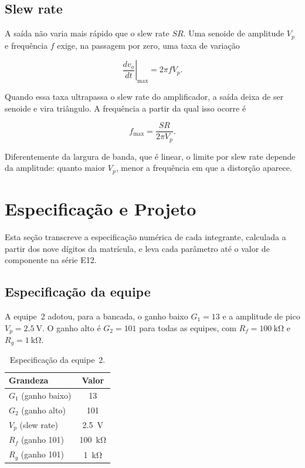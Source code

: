 \documentclass[11pt,a4paper]{article}
\begin{document}
\subsection{Slew rate}

A saída não varia mais rápido que o slew rate $SR$. Uma senoide de amplitude $V_p$ e frequência $f$ exige, na passagem por zero, uma taxa de variação

\begin{equation}
\left. \frac{dv_o}{dt} \right|_{\max} = 2\pi f V_p .
\label{eq:slew}
\end{equation}

Quando essa taxa ultrapassa o slew rate do amplificador, a saída deixa de ser senoide e vira triângulo. A frequência a partir da qual isso ocorre é

\begin{equation}
f_{\max} = \frac{SR}{2\pi V_p} .
\label{eq:fmax}
\end{equation}

Diferentemente da largura de banda, que é linear, o limite por slew rate depende da amplitude: quanto maior $V_p$, menor a frequência em que a distorção aparece.

\section{Especificação e Projeto}

Esta seção transcreve a especificação numérica de cada integrante, calculada a partir dos nove dígitos da matrícula, e leva cada parâmetro até o valor de componente na série E12.

\subsection{Especificação da equipe}

A equipe~2 adotou, para a bancada, o ganho baixo $G_1 = 13$ e a amplitude de pico $V_p = \SI{2,5}{\volt}$. O ganho alto é $G_2 = 101$ para todas as equipes, com $R_f = \SI{100}{\kilo\ohm}$ e $R_g = \SI{1}{\kilo\ohm}$.

\begin{table}[h]
\centering
\caption{Especificação da equipe~2.}
\label{tab:equipe_r3}
\begin{tabular}{lc}
\hline
Grandeza & Valor \\
\hline
$G_1$ (ganho baixo) & 13 \\
$G_2$ (ganho alto) & 101 \\
$V_p$ (slew rate) & \SI{2,5}{\volt} \\
$R_f$ (ganho 101) & \SI{100}{\kilo\ohm} \\
$R_g$ (ganho 101) & \SI{1}{\kilo\ohm} \\
\hline
\end{tabular}
\end{table}
\end{document}
